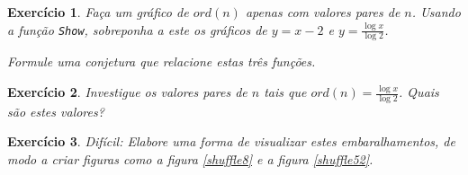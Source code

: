 \documentclass{article}
\newtheorem{ex}{Exercício}
\begin{document}
\begin{ex}
Faça um gráfico de $ord(n)$ apenas com valores pares de $n$. Usando a função \texttt{Show}, sobreponha a este os gráficos de $y = x-2$ e $y = \frac{\log x}{\log2}$.

Formule uma conjetura que relacione estas três funções.
\end{ex}

\begin{ex}
Investigue os valores pares de $n$ tais que $ord(n) = \frac{\log x}{\log 2}$. Quais são estes valores?
\end{ex}

\begin{ex}
Difícil: Elabore uma forma de visualizar estes embaralhamentos, de modo a criar figuras como a figura \ref{shuffle8} e a figura \ref{shuffle52}.
\end{ex}
\end{document}
